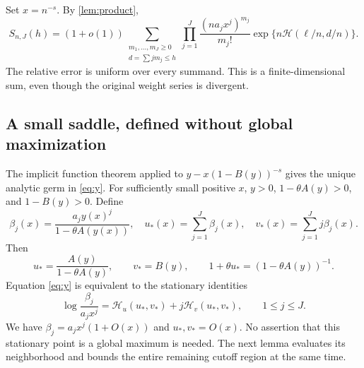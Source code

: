 \documentclass[11pt,a4paper]{article}
\theoremstyle{definition}
\theoremstyle{remark}
\numberwithin{equation}{section}
\begin{document}
Set $x=n^{-s}$. By \cref{lem:product},
\begin{equation}
 S_{n,J}(h)=(1+o(1))\!
 \sum_{\substack{m_1,\ldots,m_J\ge0\\d=\sum jm_j\le h}}
 \prod_{j=1}^J\frac{(na_jx^j)^{m_j}}{m_j!}
       \exp\{n\mathcal H(\ell/n,d/n)\}.
 \label{eq:interactionsum}
\end{equation}
The relative error is uniform over every summand. This is a
finite-dimensional sum, even though the original weight series is
divergent.

\subsection{A small saddle, defined without global maximization}
The implicit function theorem applied to
$y-x(1-B(y))^{-s}$ gives the unique analytic germ in \eqref{eq:y}.
For sufficiently small positive $x$, $y>0$, $1-\theta A(y)>0$, and
$1-B(y)>0$. Define
\begin{equation}
 \beta_j(x)=\frac{a_jy(x)^j}{1-\theta A(y(x))},
 \quad u_*(x)=\sum_{j=1}^J\beta_j(x),
 \quad v_*(x)=\sum_{j=1}^Jj\beta_j(x).
 \label{eq:betas}
\end{equation}
Then
\begin{equation}
 u_* =\frac{A(y)}{1-\theta A(y)},\qquad
 v_*=B(y),\qquad
 1+\theta u_*=(1-\theta A(y))^{-1}.
 \label{eq:uv}
\end{equation}
Equation \eqref{eq:y} is equivalent to the stationary identities
\begin{equation}
 \log\frac{\beta_j}{a_jx^j}
 =\mathcal H_u(u_*,v_*)+j\mathcal H_v(u_*,v_*),
 \qquad1\le j\le J.
 \label{eq:stationarity}
\end{equation}
We have $\beta_j=a_jx^j(1+O(x))$ and $u_*,v_*=O(x)$.
No assertion that this stationary point is a global maximum is needed.
The next lemma evaluates its neighborhood and bounds the entire
remaining cutoff region at the same time.
\end{document}
